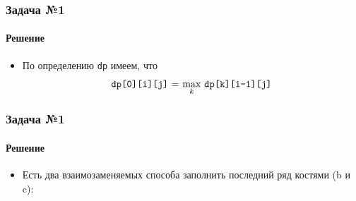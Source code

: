 \documentclass{beamer}
\begin{document}
\begin{frame}
\frametitle{Задача №1}
\framesubtitle{Решение}
\fontsize{10pt}{7.2}\selectfont
\begin{itemize}
\item По определению \texttt{dp} имеем, что 
$$\text{\texttt{dp[0][i][j]} = $\max\limits_{k}$ \texttt{dp[k][i-1][j]}}$$

\end{itemize}
\end{frame}








\begin{frame}
\frametitle{Задача №1}
\framesubtitle{Решение}
\fontsize{10pt}{7.2}\selectfont
\begin{itemize}
\item Есть два взаимозаменяемых способа заполнить последний ряд костями (b и c):


\end{itemize}
\end{frame}
\end{document}
